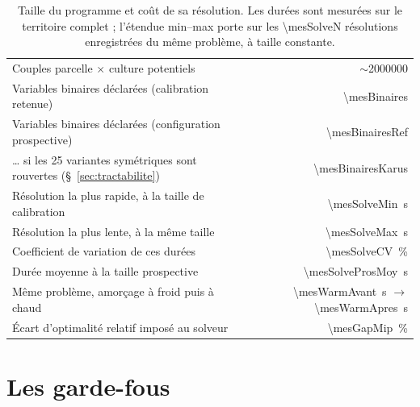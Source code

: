 \begin{table}[h]
  \centering
  \caption{Taille du programme et coût de sa résolution. Les durées sont mesurées sur le
  territoire complet ; l'étendue min--max porte sur les \num{\mesSolveN} résolutions
  enregistrées du même problème, à taille constante.}
  \label{tab:programme}
  \small
  \begin{tabularx}{\textwidth}{@{}>{\raggedright\arraybackslash}Xr@{}}
    \toprule
    Couples parcelle $\times$ culture potentiels & $\sim$\num{2000000} \\
    Variables binaires déclarées (calibration retenue) & \num{\mesBinaires} \\
    Variables binaires déclarées (configuration prospective) & \num{\mesBinairesRef} \\
    \dots{} si les \num{25} variantes symétriques sont rouvertes (§~\ref{sec:tractabilite})
      & \num{\mesBinairesKarus} \\
    \midrule
    Résolution la plus rapide, à la taille de calibration & \SI{\mesSolveMin}{\second} \\
    Résolution la plus lente, à la même taille & \SI{\mesSolveMax}{\second} \\
    Coefficient de variation de ces durées & \SI{\mesSolveCV}{\percent} \\
    Durée moyenne à la taille prospective & \SI{\mesSolveProsMoy}{\second} \\
    Même problème, amorçage à froid puis à chaud
      & \SI{\mesWarmAvant}{\second} $\rightarrow$ \SI{\mesWarmApres}{\second} \\
    Écart d'optimalité relatif imposé au solveur & \SI{\mesGapMip}{\percent} \\
    \bottomrule
  \end{tabularx}
\end{table}

\section{Les garde-fous}
\label{sec:gardefous}

